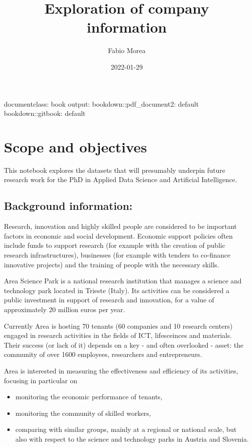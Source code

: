 \documentclass[
]{scrbook}
\title{Exploration of company information}
\author{Fabio Morea}
\date{2022-01-29}
\providecommand{\tightlist}{%
  \setlength{\itemsep}{0pt}\setlength{\parskip}{0pt}}
\begin{document}
\maketitle

{
\setcounter{tocdepth}{1}
\tableofcontents
}
documentclass: book
output:
bookdown::pdf\_document2: default
bookdown::gitbook: default

\hypertarget{scope-and-objectives}{%
\chapter{Scope and objectives}\label{scope-and-objectives}}

This notebook explores the datasets that will presumably underpin future research work for the PhD in Applied Data Science and Artificial Intelligence.

\hypertarget{background-information}{%
\section{Background information:}\label{background-information}}

Research, innovation and highly skilled people are considered to be important factors in economic and social development.
Economic support policies often include funds to support research (for example with the creation of public research infrastructures), businesses (for example with tenders to co-finance innovative projects) and the training of people with the necessary skills.

Area Science Park is a national research institution that manages a science and technology park located in Trieste (Italy). Its activities can be considered a public investment in support of research and innovation, for a value of approximately 20 million euros per year.

Currently Area is hosting 70 tenants (60 companies and 10 research centers) engaged in research activities in the fields of ICT, lifesceinces and materials. Their success (or lack of it) depends on a key - and often overlooked - asset: the community of over 1600 employees, researchers and entrepreneurs.

Area is interested in measuring the effectiveness and efficiency of its activities, focusing in particular on

\begin{itemize}
\tightlist
\item
  monitoring the economic performance of tenants,
\item
  monitoring the community of skilled workers,
\item
  comparing with similar groups, mainly at a regional or national scale, but also with respect to the science and technology parks in Austria and Slovenia.
\end{itemize}
\end{document}
